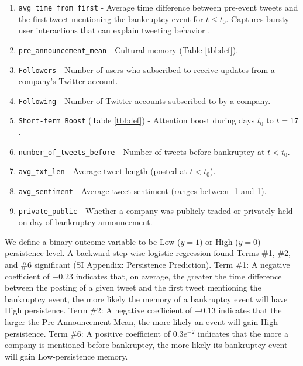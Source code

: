 \documentclass[9pt,twocolumn,twoside,lineno]{pnas-new}
\begin{document}
\begin{enumerate}
    \item 
        \texttt{avg\_time\_from\_first} - 
        Average time difference between pre-event tweets and the first tweet mentioning the bankruptcy event for $t \leq t_0$.
        Captures bursty user interactions that can explain tweeting behavior \cite{bartal2020local}.

        \item 
        \texttt{pre\_announcement\_mean} - Cultural memory (Table \ref{tbl:def}).
        
        \item 
        \texttt{Followers} - Number of users who subscribed to receive updates from a company's Twitter account.

        \item 
        \texttt{Following} - Number of Twitter accounts subscribed to by a company.
        
        \item 
        \texttt{Short-term Boost} (Table \ref{tbl:def}) - Attention boost during days $t_0$ to $t=17$.
        
        \item 
        \texttt{number\_of\_tweets\_before} - Number of tweets before bankruptcy at $t<t_0$.
        
        \item 
        \texttt{avg\_txt\_len} - Average tweet length (posted at $t<t_0$).
        
        \item 
        \texttt{avg\_sentiment} - Average tweet sentiment (ranges between -1 and 1).

        \item 
        \texttt{private\_public} - Whether a company was publicly traded or privately held on day of bankruptcy announcement.

\end{enumerate}

We define a binary outcome variable to be Low ($y=1$) or High ($y=0$) persistence level.
A backward step-wise logistic regression found Terms \#1, \#2, and \#6 significant (SI Appendix: Persistence Prediction).
Term \#1: A negative coefficient of $-0.23$ indicates that, on average, the greater the time difference between the posting of a given tweet and the first tweet mentioning the bankruptcy event, the more likely the memory of a bankruptcy event will have High persistence.
Term \#2: A negative coefficient of $-0.13$ indicates that the larger the Pre-Announcement Mean, the more likely an event will gain High persistence.
Term \#6: A positive coefficient of $0.3e^{-2}$ indicates that the more a company is mentioned before bankruptcy, the more likely its bankruptcy event will gain Low-persistence memory.
\end{document}
